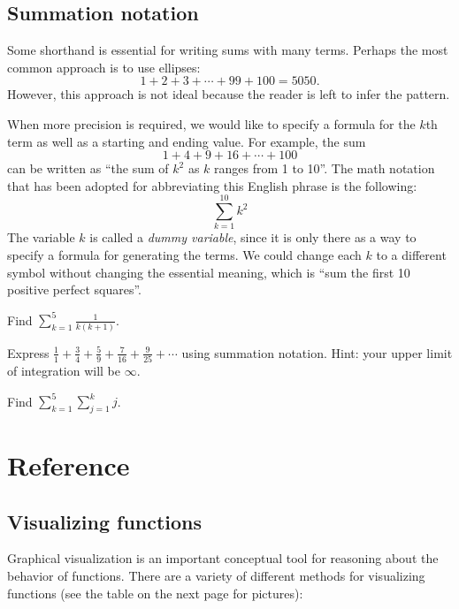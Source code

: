 \documentclass{watsonbook}
\begin{document}
\subsection{Summation notation}

Some shorthand is essential for writing sums with many
terms. Perhaps the most common approach is to use ellipses:
\[
  1 + 2  + 3 + \cdots + 99 + 100 = 5050. 
\]
However, this approach is not ideal because the reader is left to
infer the pattern.

When more precision is required, we would like to specify a formula
for the $k$th term as well as a starting and ending value. For
example, the sum
\[
  1 + 4 + 9 + 16 + \cdots + 100
\]
can be written as ``the sum of $k^2$ as $k$ ranges from 1 to
10''. The math notation that has been adopted for abbreviating this
English phrase is the following:
\[
  \sum_{k=1}^{10} k^2 
\]
The variable $k$ is called a \textit{dummy variable}, since it is
only there as a way to specify a formula for generating the
terms. We could change each $k$ to a different symbol without
changing the essential meaning, which is ``sum the first 10 positive
perfect squares''.

\begin{exercise}{}{}
  Find $\displaystyle{\sum_{k=1}^5\frac{1}{k(k+1)}}$. 
\end{exercise}

\begin{exercise}{}{}
  Express $\tfrac{1}{1} + \tfrac{3}{4} + \tfrac{5}{9} +
  \tfrac{7}{16} + \tfrac{9}{25} + \cdots$ using summation
  notation. Hint: your upper limit of integration will be $\infty$. 
\end{exercise}

\begin{exercise}{}{}
  Find $\displaystyle{\sum_{k=1}^5\sum_{j=1}^k j }$. 
\end{exercise}

\newpage

\section{Reference} 

\subsection{Visualizing functions}

Graphical visualization is an important conceptual tool for reasoning
about the behavior of functions. There are a variety of different
methods for visualizing functions (see the table on the next page
for pictures):
\end{document}
